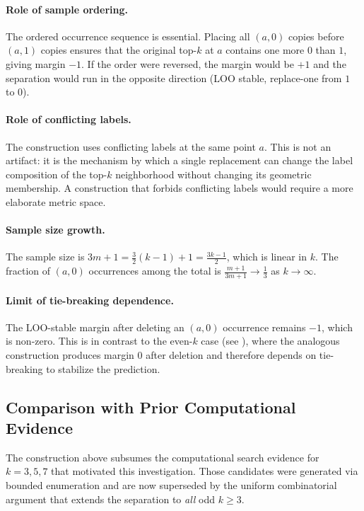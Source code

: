 \paragraph{Role of sample ordering.} The ordered occurrence sequence is
essential. Placing all $(a,0)$ copies before $(a,1)$ copies ensures that the
original top-$k$ at $a$ contains one more $0$ than $1$, giving margin $-1$.
If the order were reversed, the margin would be $+1$ and the separation would
run in the opposite direction (LOO stable, replace-one from $1$ to $0$).

\paragraph{Role of conflicting labels.} The construction uses conflicting
labels at the same point $a$. This is not an artifact: it is the mechanism
by which a single replacement can change the label composition of the top-$k$
neighborhood without changing its geometric membership. A construction that
forbids conflicting labels would require a more elaborate metric space.

\paragraph{Sample size growth.} The sample size is $3m+1 = \frac{3}{2}(k-1)+1 =
\frac{3k-1}{2}$, which is linear in $k$. The fraction of $(a,0)$ occurrences
among the total is $\frac{m+1}{3m+1} \to \frac{1}{3}$ as $k \to \infty$.

\paragraph{Limit of tie-breaking dependence.} The LOO-stable margin after
deleting an $(a,0)$ occurrence remains $-1$, which is non-zero. This is in
contrast to the even-$k$ case (see ), where the
analogous construction produces margin $0$ after deletion and therefore depends
on tie-breaking to stabilize the prediction.

\subsection{Comparison with Prior Computational Evidence}

The construction above subsumes the computational search evidence for
$k=3,5,7$ that motivated this investigation.  Those candidates were generated
via bounded enumeration and are now superseded by the uniform combinatorial
argument that extends the separation to {\em all} odd $k \ge 3$.
